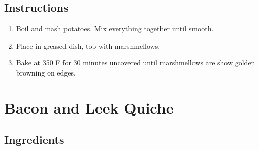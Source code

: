 \documentclass[letterpaper,10pt,english]{sphinxmanual}
\begin{document}
\section{Instructions}
\label{\detokenize{Sweet_PS:instructions}}\begin{enumerate}
\item {} 
Boil and mash potatoes. Mix everything together until smooth.

\item {} 
Place in greased dish, top with marshmellows.

\item {} 
Bake at 350 F for 30 minutes uncovered until marshmellows are show golden browning on edges.

\end{enumerate}


\chapter{Bacon and Leek Quiche}
\label{\detokenize{Bacon_Leek_Quiche:bacon-and-leek-quiche}}\label{\detokenize{Bacon_Leek_Quiche::doc}}

\section{Ingredients}
\label{\detokenize{Bacon_Leek_Quiche:ingredients}}
%
\begin{sphinxVerbatim}[commandchars=\\\{\}]
        

    

   

       

      

 

    

  
\end{sphinxVerbatim}
\end{document}
